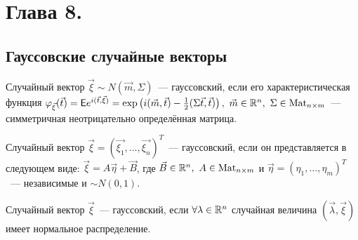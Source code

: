\section{Глава 8.}
\subsection{Гауссовские случайные векторы}
	\begin{definition}[1]
		Случайный вектор $\vec{\xi} \sim N(\vec{m}, \Sigma)$~--- гауссовский, если его характеристическая функция $\varphi_{\vec{\xi}}(\vec{t}) = \mathsf{E} e^{i(\vec{t},\vec{\xi})} = \exp\left(i(\vec{m}, \vec{t}) - \frac{1}{2}(\Sigma \vec{t}, \vec{t})\right), ~ \vec{m} \in \mathbb{R}^n, ~\Sigma \in \operatorname{Mat}_{n \times m}$~--- симметричная неотрицательно определённая матрица.
	\end{definition}

	\begin{definition}[2]
		Случайный вектор $\vec{\xi}  = (\vec{\xi_1}, \dots, \vec{\xi_n})^T$~--- гауссовский, если он представляется в следующем виде: $\vec{\xi} = A\vec{\eta} + \vec{B}$, где $\vec{B} \in \mathbb{R}^n, ~A\in \operatorname{Mat}_{n\times m}$ и $\vec{\eta} = (\eta_1, \ldots, \eta_m)^T$~--- независимые и $\sim N(0, 1)$.
	\end{definition}

	\begin{definition}[3]
		Случайный вектор $\vec{\xi}$~--- гауссовский, если \(\forall \lambda \in \mathbb{R}^n\) случайная величина \((\vec{\lambda}, \vec{\xi})\) имеет нормальное распределение.
	\end{definition}


